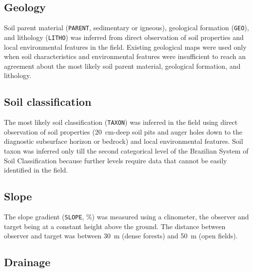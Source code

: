 \tocless\subsection{Geology}

Soil parent material (\texttt{PARENT}, sedimentary or igneous), geological formation (\texttt{GEO}),
and lithology (\texttt{LITHO}) was inferred from direct observation of soil properties and local 
environmental features in the field. Existing geological maps were used only when soil 
characteristics and environmental features were insufficient to reach an agreement about the most 
likely soil parent material, geological formation, and lithology.

\tocless\subsection{Soil classification}

The most likely soil classification (\texttt{TAXON}) was inferred in the field using direct 
observation of soil properties (\SI{20}{\centi\metre}-deep soil pits and auger holes down to the 
diagnostic subsurface horizon or bedrock) and local environmental features. Soil taxon was inferred 
only till the second categorical level of the Brazilian System of Soil Classification 
\cite{SantosEtAl2013a} because further levels require data that cannot be easily identified in the 
field.


\tocless\subsection{Slope}

The slope gradient (\texttt{SLOPE}, \si{\percent}) was measured using a clinometer, the observer
and target being at a constant height above the ground. The distance between observer and target was 
between \SI{30}{\metre} (dense forests) and \SI{50}{\metre} (open fields).

\tocless\subsection{Drainage}

